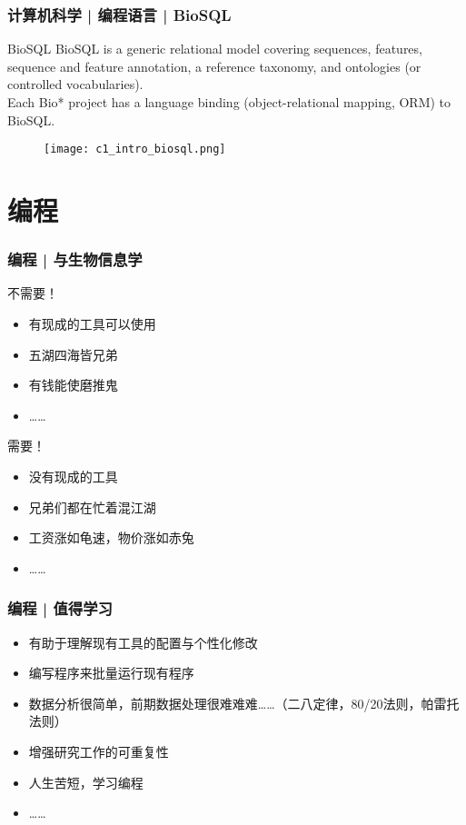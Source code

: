 \begin{frame}
  \frametitle{计算机科学 | 编程语言 | BioSQL}
  \begin{block}{BioSQL}
    BioSQL is a generic relational model covering sequences, features, sequence and feature annotation, a reference taxonomy, and ontologies (or controlled vocabularies).\\
    \vspace{0.3em}
    Each Bio* project has a language binding (object-relational mapping, ORM) to BioSQL.
  \end{block}
  \begin{figure}
    \centering
    \texttt{[image: c1\_intro\_biosql.png]}
  \end{figure}
\end{frame}

\section{编程}
\begin{frame}
  \frametitle{编程 | 与生物信息学}
  \begin{block}{不需要！}
    \begin{itemize}
      \item 有现成的工具可以使用
      \item 五湖四海皆兄弟
      \item 有钱能使磨推鬼
      \item ……
    \end{itemize}
  \end{block}
  \pause
  \begin{block}{需要！}
    \begin{itemize}
      \item 没有现成的工具
      \item 兄弟们都在忙着混江湖
      \item 工资涨如龟速，物价涨如赤兔
      \item ……
    \end{itemize}
  \end{block}
\end{frame}

\begin{frame}
  \frametitle{编程 | 值得学习}
  \begin{itemize}
    \item 有助于理解现有工具的配置与个性化修改
    \item 编写程序来批量运行现有程序
    \item
      数据分析很简单，前期数据处理很难难难……（二八定律，80/20法则，帕雷托法则）
    \item 增强研究工作的可重复性
    \item 人生苦短，学习编程
    \item ……
  \end{itemize}
\end{frame}

